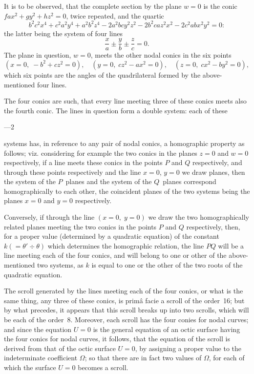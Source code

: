\documentclass[11pt,a4paper]{book}
\begin{document}
It is to be observed, that the complete section by the plane $w = 0$ is the conic $fax^{2} + gy^{2} + hz^{2} = 0$, twice repeated, and the quartic
\[
b^{2}c^{2}x^{4} + c^{2}a^{2}y^{4} + a^{2}b^{2}z^{4} - 2a^{2}bc y^{2}z^{2} - 2b^{2}ca z^{2}x^{2} - 2c^{2}ab x^{2}y^{2} = 0:
\]
the latter being the system of four lines
\[
\frac{x}{a} \pm \frac{y}{b} \pm \frac{z}{c} = 0.
\]
The plane in question, $w = 0$, meets the other nodal conics in the six points
\[
(x=0,\; -b^{2} + cz^{2}=0), \quad (y=0,\; cz^{2} - ax^{2}=0), \quad (z=0,\; cx^{2} - by^{2}=0),
\]
which six points are the angles of the quadrilateral formed by the above-mentioned four lines.

The four conics are such, that every line meeting three of these conics meets also the fourth conic. The lines in question form a double system: each of these

\medskip{}---2

\newpage
\setcounter{page}{104}

systems has, in reference to any pair of nodal conics, a homographic property as follows; viz. considering for example the two conics in the planes $z = 0$ and $w = 0$ respectively, if a line meets these conics in the points $P$ and $Q$ respectively, and through these points respectively and the line $x=0$, $y=0$ we draw planes, then the system of the $P$~planes and the system of the $Q$~planes correspond homographically to each other, the coincident planes of the two systems being the planes $x=0$ and $y=0$ respectively.

Conversely, if through the line $(x=0,\; y=0)$ we draw the two homographically related planes meeting the two conics in the points $P$ and $Q$ respectively, then, for a proper value (determined by a quadratic equation) of the constant $k(=\theta' \div \theta)$ which determines the homographic relation, the line $PQ$ will be a line meeting each of the four conics, and will belong to one or other of the above-mentioned two systems, as $k$ is equal to one or the other of the two roots of the quadratic equation.

The scroll generated by the lines meeting each of the four conics, or what is the same thing, any three of these conics, is prim\^{a} facie a scroll of the order~16; but by what precedes, it appears that this scroll breaks up into two scrolls, which will be each of the order~8. Moreover, each scroll has the four conies for nodal curves; and since the equation $U=0$ is the general equation of an octic surface having the four conics for nodal curves, it follows, that the equation of the scroll is derived from that of the octic surface $U=0$, by assigning a proper value to the indeterminate coefficient $\Omega$; so that there are in fact two values of $\Omega$, for each of which the surface $U=0$ becomes a scroll.
\end{document}
